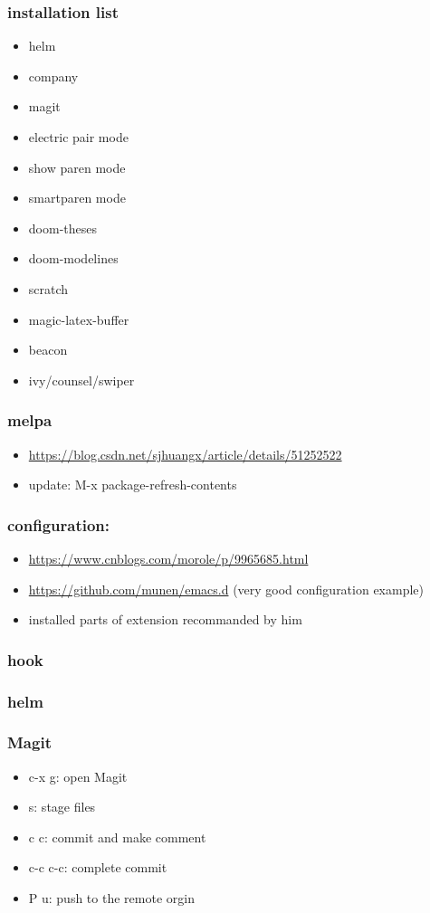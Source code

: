 \documentclass[11pt]{article}
\begin{document}
\subsubsection{installation list}
\label{sec:org0d464b6}
\begin{itemize}
\item helm
\item company
\item magit
\item electric pair mode
\item show paren mode
\item smartparen mode
\item doom-theses
\item doom-modelines
\item scratch
\item magic-latex-buffer
\item beacon
\item ivy/counsel/swiper
\end{itemize}
\subsubsection{melpa}
\label{sec:orgb63df30}
\begin{itemize}
\item \url{https://blog.csdn.net/sjhuangx/article/details/51252522}
\item update: M-x package-refresh-contents
\end{itemize}
\subsubsection{configuration:}
\label{sec:org3c8a3b5}
\begin{itemize}
\item \url{https://www.cnblogs.com/morole/p/9965685.html}
\item \url{https://github.com/munen/emacs.d} (very good configuration example)
\item installed parts of extension recommanded by him
\end{itemize}
\subsubsection{hook}
\label{sec:orgf141269}
\subsubsection{helm}
\label{sec:org8492d50}
\subsubsection{Magit}
\label{sec:org4f2da51}
\begin{itemize}
\item c-x g: open Magit
\item s: stage files
\item c c: commit and make comment
\item c-c c-c: complete commit
\item P u: push to the remote orgin
\end{itemize}
\end{document}
